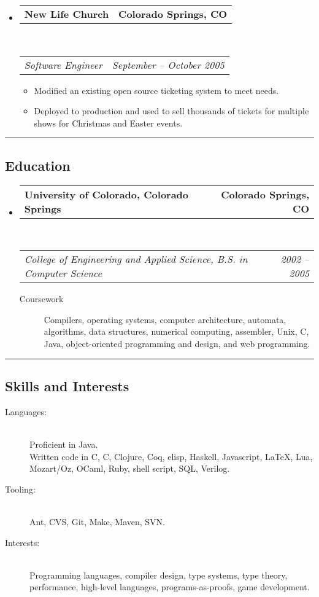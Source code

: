 \documentclass[10pt,letterpaper]{article}
\makeatletter
\newenvironment{indentsection}[1]%
{\begin{list}{}%
	{\setlength{\leftmargin}{#1}}%
	\item[]%
}
{\end{list}}
\newcommand{\headerrow}[2]
{\begin{tabular*}{\linewidth}{l@{\extracolsep{\fill}}r}
	#1 &
	#2 \\
\end{tabular*}}
\newcommand{\CPP}
{C\nolinebreak[4]\hspace{-.05em}\raisebox{.22ex}{\footnotesize\bf ++}}
\makeatother
\begin{document}
\begin{itemize}
	\item
	\headerrow
		{\textbf{New Life Church}}
		{\textbf{Colorado Springs, CO}}
	\\
	\headerrow
		{\emph{Software Engineer}}
		{\emph{September -- October 2005}}
	\begin{itemize}
		\item Modified an existing open source ticketing system to meet needs.
		\item Deployed to production and used to sell thousands of tickets for multiple shows for Christmas and Easter events.
	\end{itemize}

\end{itemize}


\hrule
\vspace{-0.4em}
\subsection*{Education}

\begin{itemize}
	\parskip=0.1em

	\item
	\headerrow
		{\textbf{University of Colorado, Colorado Springs}}
		{\textbf{Colorado Springs, CO}}
	\\
	\headerrow
		{\emph{College of Engineering and Applied Science, B.S. in Computer Science}}
		{\emph{2002 -- 2005}}
	\begin{description}
		\item[Coursework] Compilers, operating systems, computer architecture, automata, algorithms, data structures, numerical computing, assembler, Unix, C, Java, object-oriented programming and design, and web programming.
	\end{description}

\end{itemize}


\hrule
\vspace{-0.4em}
\subsection*{Skills and Interests}

\begin{indentsection}{\parindent}
\begin{description}
	\item[Languages:] \ \\
	Proficient in Java. \\
	Written code in C, \CPP, Clojure, Coq, elisp, Haskell, Javascript, \LaTeX, Lua, Mozart/Oz, OCaml, Ruby, shell script, SQL, Verilog.
	\item[Tooling:] \ \\
	Ant, CVS, Git, Make, Maven, SVN.
	\item[Interests:] \ \\
	Programming languages, compiler design, type systems, type theory, performance, high-level languages, programs-as-proofs, game development.
\end{description}
\end{indentsection}
\end{document}
